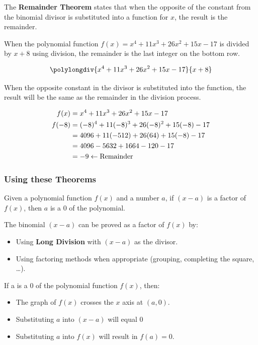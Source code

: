 \begin{theorem}
    The \textbf{Remainder Theorem} states that when the opposite of the constant from the binomial divisor is substituted into a function for $x$, the result is the remainder.

    When the polynomial function $f(x) = x^4 + 11x^3 + 26x^2 + 15x - 17$ is divided by $x + 8$ using division, the remainder is the last integer on the bottom row.

    \[ \polylongdiv{x^4 + 11x^3 + 26x^2 + 15x - 17}{x + 8} \]
    
    When the opposite constant in the divisor is substituted into the function, the result will be the same as the remainder in the division process.
    
    \begin{align}
        f(x)  &= x^4 + 11x^3 + 26x^2 + 15x - 17 \\
        f(-8) &= (-8)^4 + 11(-8)^3 + 26(-8)^2 + 15(-8) - 17 \\
              &= 4096 + 11(-512) + 26(64) + 15(-8) - 17 \\
              &= 4096 - 5632 + 1664 - 120 - 17 \\
              &= -9 \leftarrow \rm{Remainder}
    \end{align}
\end{theorem}

\subsubsection*{Using these Theorems}

Given a polynomial function $f(x)$ and a number $a$, if $(x - a)$ is a factor of $f(x)$, then $a$ is a $0$ of the polynomial.

The binomial $(x - a)$ can be proved as a factor of $f(x)$ by:

\begin{itemize}
    \item Using \textbf{Long Division} with $(x - a)$ as the divisor.
    \item Using factoring methods when appropriate (grouping, completing the square, \ldots).
\end{itemize}

If a is a $0$ of the polynomial function $f(x)$, then:

\begin{itemize}
    \item The graph of $f(x)$ crosses the $x$ axis at $(a,0)$.
    \item Substituting $a$ into $(x - a)$ will equal $0$
    \item Substituting $a$ into $f(x)$ will result in $f(a) = 0$.
\end{itemize}

\newpage
